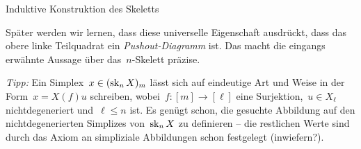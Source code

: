 \documentclass{uebblatt}
\begin{document}
\begin{aufgabe}{Induktive Konstruktion des Skeletts}
\begin{enumerate}
Später werden wir lernen, dass diese universelle Eigenschaft ausdrückt, dass
das obere linke Teilquadrat ein \emph{Pushout-Diagramm} ist. Das macht die
eingangs erwähnte Aussage über das~$n$-Skelett präzise.

{\tiny
\emph{Tipp:} Ein Simplex~$x \in (\operatorname{sk}_n X)_m$ lässt sich auf eindeutige Art und
Weise in der Form~$x = X(f)u$ schreiben, wobei~$f : [m] \to [\ell]$ eine
Surjektion,~$u \in X_\ell$ nichtdegeneriert und~$\ell \leq n$ ist. Es genügt
schon, die gesuchte Abbildung auf den nichtdegenerierten Simplizes von~$\operatorname{sk}_n
X$ zu definieren -- die restlichen Werte sind durch das Axiom an simpliziale
Abbildungen schon festgelegt (inwiefern?).\par}
\end{enumerate}
\end{aufgabe}
\end{document}
